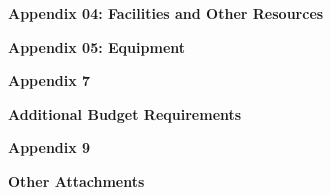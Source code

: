 \documentclass[11pt,english]{article}
\def\centerhead#1{
	\begin{center}
	\Large\textbf{#1}
	\end{center}}
\begin{document}
 {}


\newpage
\centerhead{Appendix 04: Facilities and Other Resources}


\newpage
\centerhead{Appendix 05: Equipment}




\newpage
\centerhead{Appendix 7}
\centerhead{Additional Budget Requirements}
\newpage





\newpage
\newpage





\newpage
\centerhead{Appendix 9}
\centerhead{Other Attachments}
\newpage

%
%
\end{document}
